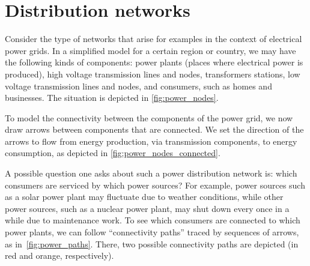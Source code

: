 
\section{Distribution networks}\label{sec:connection-distribution-networks}
Consider the type of networks that arise for examples in the context of electrical power grids.
In a simplified model for a certain region or country, we may have the following kinds of components: power plants (places where electrical power is produced), high voltage transmission lines and nodes, transformers stations, low voltage transmission lines and nodes, and consumers, such as homes and businesses.
The situation is depicted in \cref{fig:power_nodes}.

\begin{figure*}[p]
    \centering
    \caption{Components of electrical power grids.}
    \label{fig:power_nodes}
\end{figure*}

To model the connectivity between the components of the power grid, we now draw arrows between components that are connected.
We set the direction of the arrows to flow from energy production, via transmission components, to energy consumption, as depicted in \cref{fig:power_nodes_connected}.
\begin{figure*}[p]
    \centering
    \caption{Connectivity between components in electric power grids.}
    \label{fig:power_nodes_connected}
\end{figure*}

A possible question one asks about such a power distribution network is: which consumers are serviced by which power sources?
For example, power sources such as a solar power plant may fluctuate due to weather conditions, while other power sources, such as a nuclear power plant, may shut down every once in a while due to maintenance work.
To see which consumers are connected to which power plants, we can follow ``connectivity paths'' traced by sequences of arrows, as in~\cref{fig:power_paths}.
There, two possible connectivity paths are depicted (in red and orange, respectively).

\begin{figure*}[p]
    \centering
    \caption{Connection between consumers and power plants.}
    \label{fig:power_paths}
\end{figure*}

